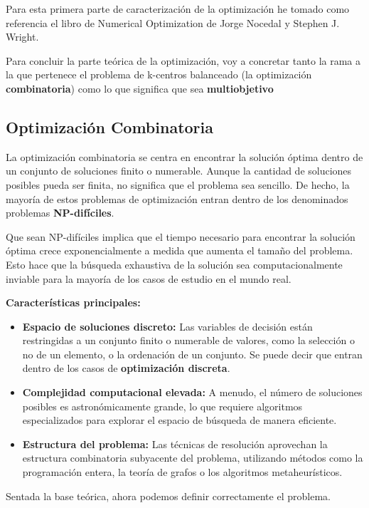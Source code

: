 \documentclass[12pt,a4paper]{book}
\begin{document}
Para esta primera parte de caracterización de la optimización he tomado como referencia el libro \cite{Numerical_optimization_nocedal_wright} de Numerical Optimization de Jorge Nocedal y Stephen J. Wright.

Para concluir la parte teórica de la optimización, voy a concretar tanto la rama a la que pertenece el problema de k-centros balanceado (la optimización \textbf{combinatoria}) como lo que significa que sea \textbf{multiobjetivo}

\subsection{Optimización Combinatoria}
La optimización combinatoria se centra en encontrar la solución óptima dentro de un conjunto de soluciones finito o numerable. Aunque la cantidad de soluciones posibles pueda ser finita, no significa que el problema sea sencillo.
De hecho, la mayoría de estos problemas de optimización entran dentro de los denominados problemas \textbf{NP-difíciles}\cite{np_hard}.

Que sean NP-difíciles implica que el tiempo necesario para encontrar la solución óptima crece exponencialmente a medida que aumenta el tamaño del problema. Esto hace que la búsqueda exhaustiva de la solución sea computacionalmente inviable para la mayoría de los casos de estudio en el mundo real.

\textbf{Características principales:}
\begin{itemize}
    \item \textbf{Espacio de soluciones discreto:} Las variables de decisión están restringidas a un conjunto finito o numerable de valores, como la selección o no de un elemento, o la ordenación de un conjunto. Se puede decir que entran dentro de los casos de \textbf{optimización discreta}. 
    \item \textbf{Complejidad computacional elevada:} A menudo, el número de soluciones posibles es astronómicamente grande, lo que requiere algoritmos especializados para explorar el espacio de búsqueda de manera eficiente.
    \item \textbf{Estructura del problema:} Las técnicas de resolución aprovechan la estructura combinatoria subyacente del problema, utilizando métodos como la programación entera, la teoría de grafos o los algoritmos metaheurísticos.
\end{itemize}

Sentada la base teórica, ahora podemos definir correctamente el problema.
\end{document}
